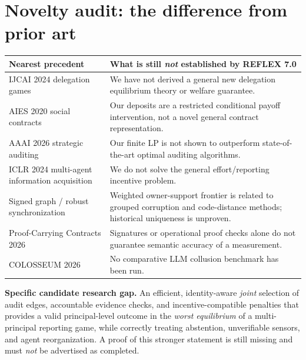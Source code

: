 \documentclass[10pt,a4paper]{article}
\begin{document}
\section{Novelty audit: the difference from prior art}
\begin{center}\footnotesize
\begin{tabularx}{\linewidth}{@{}p{.31\linewidth}X@{}}\toprule
\textbf{Nearest precedent} & \textbf{What is still \emph{not} established by REFLEX 7.0}\\\midrule
IJCAI 2024 delegation games \cite{sourbut2024} & We have not derived a general new delegation equilibrium theory or welfare guarantee.\\
AIES 2020 social contracts \cite{davoust2020} & Our deposits are a restricted conditional payoff intervention, not a novel general contract representation.\\
AAAI 2026 strategic auditing \cite{das2026} & Our finite LP is not shown to outperform state-of-the-art optimal auditing algorithms.\\
ICLR 2024 multi-agent information acquisition \cite{cacciamani2024} & We do not solve the general effort/reporting incentive problem.\\
Signed graph / robust synchronization \cite{lerman2021,group2026} & Weighted owner-support frontier is related to grouped corruption and code-distance methods; historical uniqueness is unproven.\\
Proof-Carrying Contracts 2026 \cite{ciliberto2026} & Signatures or operational proof checks alone do not guarantee semantic accuracy of a measurement.\\
COLOSSEUM 2026 \cite{colosseum2026} & No comparative LLM collusion benchmark has been run.\\\bottomrule
\end{tabularx}
\end{center}
\textbf{Specific candidate research gap.} An efficient, identity-aware \emph{joint} selection of audit edges, accountable evidence checks, and incentive-compatible penalties that provides a valid principal-level outcome in the \emph{worst equilibrium} of a multi-principal reporting game, while correctly treating abstention, unverifiable sensors, and agent reorganization. A proof of this stronger statement is still missing and must \emph{not} be advertised as completed.
\end{document}
